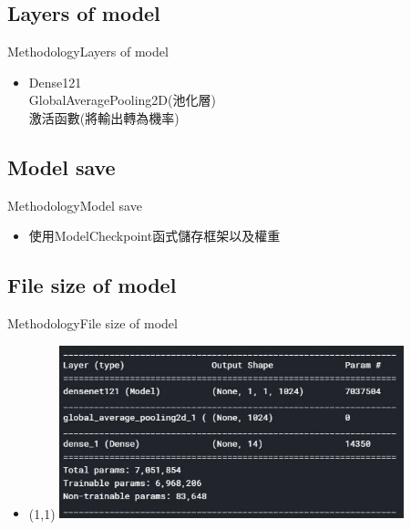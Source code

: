 \documentclass{beamer}
\begin{document}
\begin{CJK}{UTF8}{}
\subsection{Layers of model}

\begin{frame}{Methodology}{Layers of model}
	\begin{itemize}
	\item{
		Dense121\\
		GlobalAveragePooling2D(池化層)\\
		激活函數(將輸出轉為機率)\\
	}
	\end{itemize}
\end{frame}

\subsection{Model save}

\begin{frame}{Methodology}{Model save}
	\begin{itemize}
	\item{
		使用ModelCheckpoint函式儲存框架以及權重
	}
	\end{itemize}
\end{frame}

\subsection{File size of model}

\begin{frame}{Methodology}{File size of model}
\vspace{-4.5cm}
	\begin{itemize}
	\item{
		\begin{textblock}{3}(1,1)
		\includegraphics[width=10cm]{file_size_of_model.png}
		\end{textblock}
	}
	\end{itemize}
\end{frame}


\end{CJK}
\end{document}

